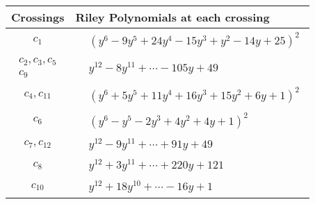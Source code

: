 \documentclass[1p]{elsarticle_modified}
\theoremstyle{definition}
\begin{document}
\begin{tabular}{m{50pt}|m{274pt}}
Crossings & \hspace{64pt}Riley Polynomials at each crossing \\
\hline $$\begin{aligned}c_{1}\end{aligned}$$&$\begin{aligned}
&(y^6-9 y^5+24 y^4-15 y^3+y^2-14 y+25)^2
\end{aligned}$\\
\hline $$\begin{aligned}c_{2},c_{3},c_{5}\\c_{9}\end{aligned}$$&$\begin{aligned}
&y^{12}-8 y^{11}+\cdots-105 y+49
\end{aligned}$\\
\hline $$\begin{aligned}c_{4},c_{11}\end{aligned}$$&$\begin{aligned}
&(y^6+5 y^5+11 y^4+16 y^3+15 y^2+6 y+1)^2
\end{aligned}$\\
\hline $$\begin{aligned}c_{6}\end{aligned}$$&$\begin{aligned}
&(y^6- y^5-2 y^3+4 y^2+4 y+1)^2
\end{aligned}$\\
\hline $$\begin{aligned}c_{7},c_{12}\end{aligned}$$&$\begin{aligned}
&y^{12}-9 y^{11}+\cdots+91 y+49
\end{aligned}$\\
\hline $$\begin{aligned}c_{8}\end{aligned}$$&$\begin{aligned}
&y^{12}+3 y^{11}+\cdots+220 y+121
\end{aligned}$\\
\hline $$\begin{aligned}c_{10}\end{aligned}$$&$\begin{aligned}
&y^{12}+18 y^{10}+\cdots-16 y+1
\end{aligned}$\\
\hline
\end{tabular}\\~\\
\end{document}
